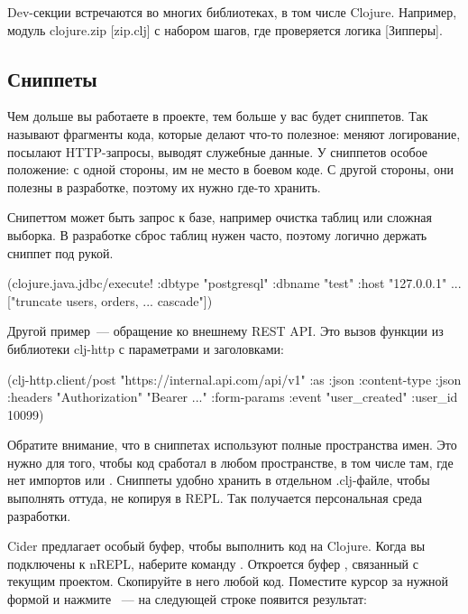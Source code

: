 Dev-секции встречаются во многих библиотеках, в том числе Clojure. Например, модуль clojure.zip [zip.clj]  с набором шагов, где проверяется логика [Зипперы].

\subsection{Сниппеты}

Чем дольше вы работаете в проекте, тем больше у вас будет сниппетов. Так называют фрагменты кода, которые делают что-то полезное: меняют логирование, посылают HTTP-запросы, выводят служебные данные. У сниппетов особое положение: с одной стороны, им не место в боевом коде. С другой стороны, они полезны в разработке, поэтому их нужно где-то хранить.

Снипеттом может быть запрос к базе, например очистка таблиц или сложная выборка. В разработке сброс таблиц нужен часто, поэтому логично держать сниппет под рукой.

\begin{english}
  \begin{clojure}
(clojure.java.jdbc/execute!
 {:dbtype "postgresql"
  :dbname "test"
  :host "127.0.0.1"
  ...}
 ["truncate users, orders, ... cascade"])
  \end{clojure}
\end{english}

Другой пример~--- обращение ко внешнему REST API. Это вызов функции  из библиотеки clj-http с параметрами и заголовками:

\begin{english}
  \begin{clojure}
(clj-http.client/post
 "https://internal.api.com/api/v1"
 {:as :json
  :content-type :json
  :headers {"Authorization" "Bearer ..."}
  :form-params {:event "user_created"
                :user_id 10099}})
  \end{clojure}
\end{english}

Обратите внимание, что в сниппетах используют полные пространства имен. Это нужно для того, чтобы код сработал в любом пространстве, в том числе там, где нет импортов  или . Сниппеты удобно хранить в отдельном .clj-файле, чтобы выполнять оттуда, не копируя в REPL. Так получается персональная среда разработки.

Cider предлагает особый буфер, чтобы выполнить код на Clojure. Когда вы подключены к nREPL, наберите команду . Откроется буфер , связанный с текущим проектом. Скопируйте в него любой код. Поместите курсор за нужной формой и нажмите ~--- на следующей строке появится результат:

